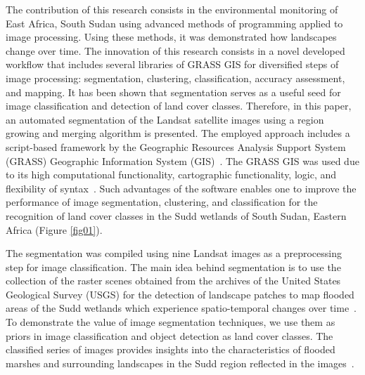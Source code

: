 \documentclass[analytics,article,accept,pdftex,moreauthors]{Definitions/mdpi}
\begin{document}
{The contribution of this research consists in the environmental monitoring of East Africa, South Sudan using advanced methods of programming applied to image processing. Using these methods, it was demonstrated how landscapes change over time. The innovation of this research consists in a novel developed workflow that includes several libraries of GRASS GIS for diversified steps of image processing: segmentation, clustering, classification, accuracy assessment, and mapping. }It has been shown that segmentation serves as a useful seed for image classification and detection of land cover classes. Therefore, in this paper, an automated segmentation of the Landsat satellite images using a region growing and merging algorithm is presented. The employed approach includes a script-based framework by the Geographic Resources Analysis Support System (GRASS) Geographic Information System (GIS)~\cite{Neteleretal2008}. The GRASS GIS was used due to its high computational functionality, cartographic functionality, logic, and flexibility of syntax~\cite{NetelerMitasova2008}. Such advantages of the software enables one to improve the performance of image segmentation, clustering, and classification for the recognition of land cover classes in the Sudd wetlands of South Sudan, Eastern Africa (Figure \ref{fig01}). 

The segmentation was compiled using nine Landsat images as a preprocessing step for image classification. The main idea behind segmentation is to use the collection of the raster scenes obtained from the archives of the United States Geological Survey (USGS) for the detection of landscape patches to map flooded areas of the Sudd wetlands which experience spatio-temporal changes over time~\cite{Petersen,SOSNOWSKI201651,Mulatu}. To demonstrate the value of image segmentation techniques, we use them as priors in image classification and object detection as land cover classes. The classified series of images provides insights into the characteristics of flooded marshes and surrounding landscapes in the Sudd region reflected in the images~\cite{CHEN201417}.  %
\end{document}

